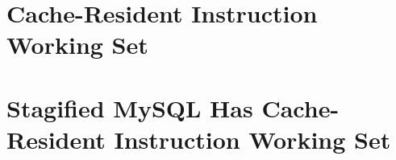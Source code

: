 \documentclass[12pt,a4paper]{book}
\begin{document}
\section{Cache-Resident Instruction Working Set}
%

\section{Stagified MySQL Has Cache-Resident Instruction Working Set}
\end{document}
